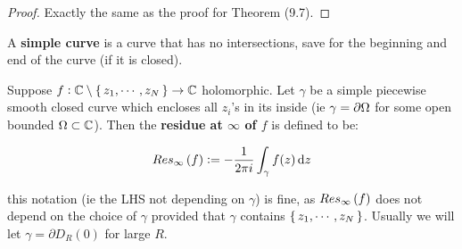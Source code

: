 \begin{proof}
Exactly the same as the proof for Theorem (9.7).
\end{proof}

\begin{definition}
A \textbf{simple curve} is a curve that has no intersections, save for the beginning and end of the curve (if it is closed).
\end{definition}



\begin{definition}
Suppose $f:\mathbb{C} \setminus \set{z_1, \cdots ,z_N} \to \mathbb{C}$ holomorphic. Let $\gamma$ be a simple piecewise smooth closed curve which encloses all $z_i$'s in its inside (ie $\gamma = \partial \Omega$ for some open bounded $\Omega \subset \mathbb{C}$). Then the \textbf{residue at $\infty$ of $f$} is defined to be:

\begin{align*}
    \res{\infty}{f} \vcentcolon = - \frac{1}{2 \pi i} \int_\gamma f(z) \dif z
\end{align*}

this notation (ie the LHS not depending on $\gamma$) is fine, as $Res_{\infty} \left( f \right)$ does not depend on the choice of $\gamma$ provided that $\gamma$ contains $\set{z_1, \cdots ,z_N}$. Usually we will let $\gamma  = \partial D_R(0)$ for large $R$.

\end{definition}



